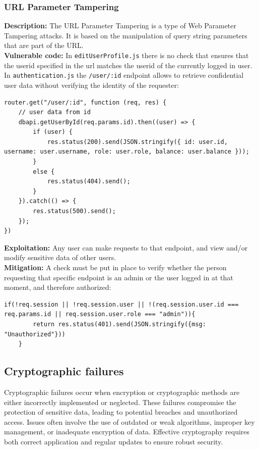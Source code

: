 \documentclass[]{article}
\begin{document}
\subsubsection{URL Parameter Tampering}
\textbf{Description:} The  URL Parameter Tampering is a type of Web Parameter Tampering attacks. It is based on the manipulation of query string parameters that are part of the URL.\\ 
\textbf{Vulnerable code:}
In \texttt{editUserProfile.js} there is no check that ensures that the userid specified in the url matches the userid of the currently logged in user.
In \texttt{authentication.js} the \texttt{/user/:id} endpoint allows to retrieve confidential user data without verifying the identity of the requester:
\begin{lstlisting}
router.get("/user/:id", function (req, res) {
    // user data from id
    dbapi.getUserById(req.params.id).then((user) => {
        if (user) {
            res.status(200).send(JSON.stringify({ id: user.id, username: user.username, role: user.role, balance: user.balance }));
        }
        else {
            res.status(404).send();
        }
    }).catch(() => {
        res.status(500).send();
    });
})
\end{lstlisting}
\textbf{Exploitation:} Any user can make requests to that endpoint, and view and/or modify sensitive data of other users.\\
\textbf{Mitigation:} A check must be put in place to verify whether the person requesting that specific endpoint is an admin or the user logged in at that moment, and therefore authorized:
\begin{lstlisting}
if(!req.session || !req.session.user || !(req.session.user.id === req.params.id || req.session.user.role === "admin")){
        return res.status(401).send(JSON.stringify({msg: "Unauthorized"}))
    }
\end{lstlisting}

\subsection{Cryptographic failures}
Cryptographic failures occur when encryption or cryptographic methods are either incorrectly implemented or neglected. These failures compromise the protection of sensitive data, leading to potential breaches and unauthorized access. Issues often involve the use of outdated or weak algorithms, improper key management, or inadequate encryption of data. Effective cryptography requires both correct application and regular updates to ensure robust security.
\end{document}
